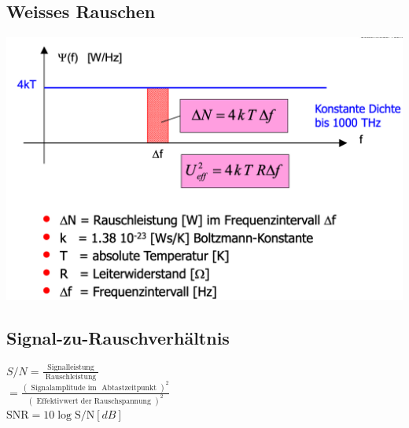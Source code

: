 \subsection{Weisses Rauschen}
\begin{center}
    \includegraphics[width=\linewidth]{graphic/rauschen/Weisses Rauschen.png}
\end{center}
\vspace{-8pt}

\subsection{Signal-zu-Rauschverhältnis}
$S / N=\frac{\text { Signalleistung }}{\text { Rauschleistung }}$\\
$=\frac{(\text { Signalamplitude im } \text { Abtastzeitpunkt })^{2}}{(\text { Effektivwert der Rauschspannung })^{2}}$\\
$\mathrm{SNR}=10 \log \mathrm{S} / \mathrm{N} [dB]$